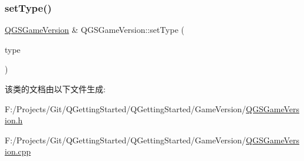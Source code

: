 \mbox{\label{class_q_g_s_game_version_abea597512458faf8061f2430163b0952}} 
\subsubsection{\texorpdfstring{set\+Type()}{setType()}}
{\footnotesize\ttfamily \mbox{\hyperlink{class_q_g_s_game_version}{Q\+G\+S\+Game\+Version}} \& Q\+G\+S\+Game\+Version\+::set\+Type (\begin{DoxyParamCaption}\item[{const Q\+String \&}]{type }\end{DoxyParamCaption})}



该类的文档由以下文件生成\+:\begin{DoxyCompactItemize}
\item 
F\+:/\+Projects/\+Git/\+Q\+Getting\+Started/\+Q\+Getting\+Started/\+Game\+Version/\mbox{\hyperlink{_q_g_s_game_version_8h}{Q\+G\+S\+Game\+Version.\+h}}\item 
F\+:/\+Projects/\+Git/\+Q\+Getting\+Started/\+Q\+Getting\+Started/\+Game\+Version/\mbox{\hyperlink{_q_g_s_game_version_8cpp}{Q\+G\+S\+Game\+Version.\+cpp}}\end{DoxyCompactItemize}
